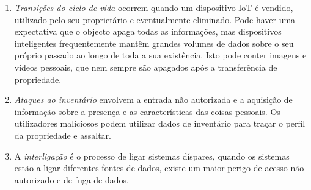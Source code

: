 \documentclass[conference]{IEEEtran}
\begin{document}
\begin{enumerate}
    \item
    \textit{Transições do ciclo de vida} ocorrem quando um dispositivo IoT
    é vendido, utilizado pelo seu proprietário e eventualmente eliminado.
    Pode haver uma expectativa que o objecto apaga todas as informações,
    mas dispositivos inteligentes frequentemente mantêm grandes volumes de
    dados sobre o seu próprio passado ao longo de toda a sua existência.
    Isto pode conter imagens e vídeos pessoais, que nem sempre são apagados
    após a transferência de propriedade.

    \item
    \textit{Ataques ao inventário} envolvem a entrada não autorizada e a
    aquisição de informação sobre a presença e as características das coisas
    pessoais. Os utilizadores maliciosos podem utilizar dados de inventário
    para traçar o perfil da propriedade e assaltar.

    \item
    A \textit{interligação} é o processo de ligar sistemas díspares, quando
    os sistemas estão a ligar diferentes fontes de dados, existe um maior
    perigo de acesso não autorizado e de fuga de dados.

\end{enumerate}
\end{document}
